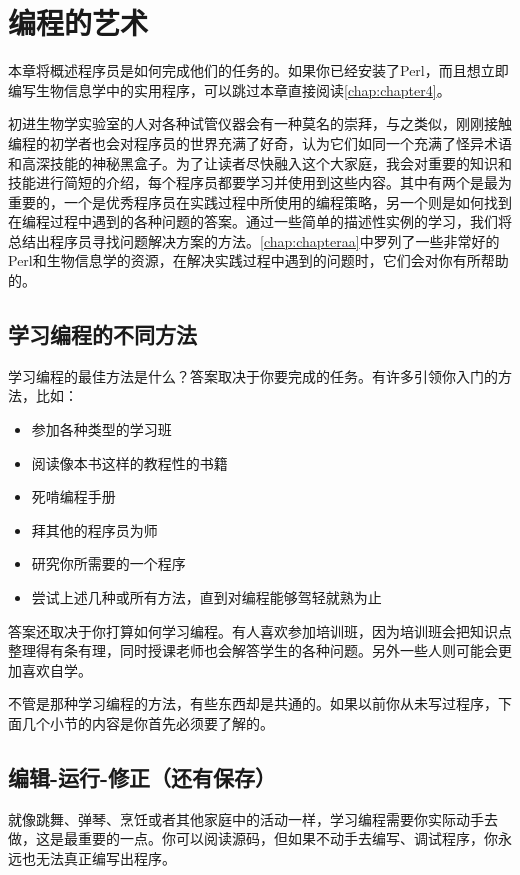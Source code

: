 \chapter{编程的艺术}
\label{chap:chapter3}
\minitoc

本章将概述程序员是如何完成他们的任务的。如果你已经安装了Perl，而且想立即编写生物信息学中的实用程序，可以跳过本章直接阅读\ref{chap:chapter4}。

初进生物学实验室的人对各种试管仪器会有一种莫名的崇拜，与之类似，刚刚接触编程的初学者也会对程序员的世界充满了好奇，认为它们如同一个充满了怪异术语和高深技能的神秘黑盒子。为了让读者尽快融入这个大家庭，我会对重要的知识和技能进行简短的介绍，每个程序员都要学习并使用到这些内容。其中有两个是最为重要的，一个是优秀程序员在实践过程中所使用的编程策略，另一个则是如何找到在编程过程中遇到的各种问题的答案。通过一些简单的描述性实例的学习，我们将总结出程序员寻找问题解决方案的方法。\ref{chap:chapteraa}中罗列了一些非常好的Perl和生物信息学的资源，在解决实践过程中遇到的问题时，它们会对你有所帮助的。

\section{学习编程的不同方法}
学习编程的最佳方法是什么？答案取决于你要完成的任务。有许多引领你入门的方法，比如：

\begin{itemize}
  \item 参加各种类型的学习班
  \item 阅读像本书这样的教程性的书籍
  \item 死啃编程手册
  \item 拜其他的程序员为师
  \item 研究你所需要的一个程序
  \item 尝试上述几种或所有方法，直到对编程能够驾轻就熟为止
\end{itemize}

答案还取决于你打算如何学习编程。有人喜欢参加培训班，因为培训班会把知识点整理得有条有理，同时授课老师也会解答学生的各种问题。另外一些人则可能会更加喜欢自学。

不管是那种学习编程的方法，有些东西却是共通的。如果以前你从未写过程序，下面几个小节的内容是你首先必须要了解的。

\section{编辑-运行-修正（还有保存）}
就像跳舞、弹琴、烹饪或者其他家庭中的活动一样，学习编程需要你实际动手去做，这是最重要的一点。你可以阅读源码，但如果不动手去编写、调试程序，你永远也无法真正编写出程序。

